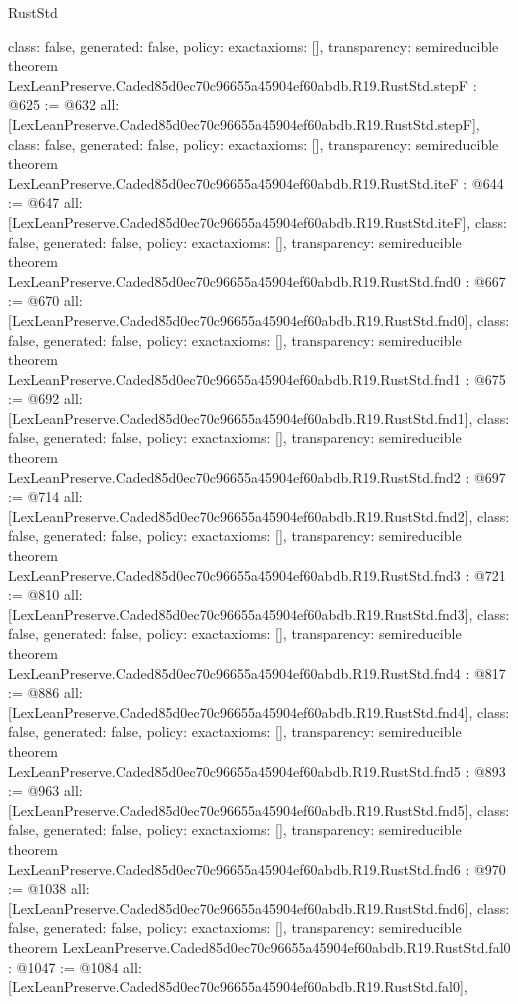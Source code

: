 \begin{lexlean}{RustStd}
\begin{coremodule}
{  class: false,
  generated: false,
  policy: exact{axioms: []},
  transparency: semireducible
}
theorem LexLeanPreserve.Caded85d0ec70c96655a45904ef60abdb.R19.RustStd.stepF : @625 := @632 {
  all: [LexLeanPreserve.Caded85d0ec70c96655a45904ef60abdb.R19.RustStd.stepF],
  class: false,
  generated: false,
  policy: exact{axioms: []},
  transparency: semireducible
}
theorem LexLeanPreserve.Caded85d0ec70c96655a45904ef60abdb.R19.RustStd.iteF : @644 := @647 {
  all: [LexLeanPreserve.Caded85d0ec70c96655a45904ef60abdb.R19.RustStd.iteF],
  class: false,
  generated: false,
  policy: exact{axioms: []},
  transparency: semireducible
}
theorem LexLeanPreserve.Caded85d0ec70c96655a45904ef60abdb.R19.RustStd.fnd0 : @667 := @670 {
  all: [LexLeanPreserve.Caded85d0ec70c96655a45904ef60abdb.R19.RustStd.fnd0],
  class: false,
  generated: false,
  policy: exact{axioms: []},
  transparency: semireducible
}
theorem LexLeanPreserve.Caded85d0ec70c96655a45904ef60abdb.R19.RustStd.fnd1 : @675 := @692 {
  all: [LexLeanPreserve.Caded85d0ec70c96655a45904ef60abdb.R19.RustStd.fnd1],
  class: false,
  generated: false,
  policy: exact{axioms: []},
  transparency: semireducible
}
theorem LexLeanPreserve.Caded85d0ec70c96655a45904ef60abdb.R19.RustStd.fnd2 : @697 := @714 {
  all: [LexLeanPreserve.Caded85d0ec70c96655a45904ef60abdb.R19.RustStd.fnd2],
  class: false,
  generated: false,
  policy: exact{axioms: []},
  transparency: semireducible
}
theorem LexLeanPreserve.Caded85d0ec70c96655a45904ef60abdb.R19.RustStd.fnd3 : @721 := @810 {
  all: [LexLeanPreserve.Caded85d0ec70c96655a45904ef60abdb.R19.RustStd.fnd3],
  class: false,
  generated: false,
  policy: exact{axioms: []},
  transparency: semireducible
}
theorem LexLeanPreserve.Caded85d0ec70c96655a45904ef60abdb.R19.RustStd.fnd4 : @817 := @886 {
  all: [LexLeanPreserve.Caded85d0ec70c96655a45904ef60abdb.R19.RustStd.fnd4],
  class: false,
  generated: false,
  policy: exact{axioms: []},
  transparency: semireducible
}
theorem LexLeanPreserve.Caded85d0ec70c96655a45904ef60abdb.R19.RustStd.fnd5 : @893 := @963 {
  all: [LexLeanPreserve.Caded85d0ec70c96655a45904ef60abdb.R19.RustStd.fnd5],
  class: false,
  generated: false,
  policy: exact{axioms: []},
  transparency: semireducible
}
theorem LexLeanPreserve.Caded85d0ec70c96655a45904ef60abdb.R19.RustStd.fnd6 : @970 := @1038 {
  all: [LexLeanPreserve.Caded85d0ec70c96655a45904ef60abdb.R19.RustStd.fnd6],
  class: false,
  generated: false,
  policy: exact{axioms: []},
  transparency: semireducible
}
theorem LexLeanPreserve.Caded85d0ec70c96655a45904ef60abdb.R19.RustStd.fal0 : @1047 := @1084 {
  all: [LexLeanPreserve.Caded85d0ec70c96655a45904ef60abdb.R19.RustStd.fal0],
}
\end{coremodule}
\end{lexlean}
